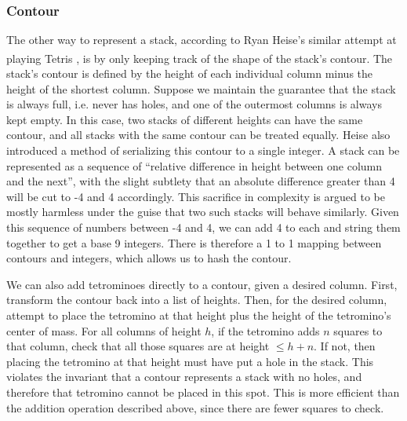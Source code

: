\documentclass[fontsize=12pt]{article}
\def\tetris{Tetris\textsuperscript{\textregistered}}
\begin{document}
\subsubsection{Contour}
\label{ssub:contour}
\par The other way to represent a stack, according to Ryan Heise's similar attempt at playing \tetris{} \cite{bib:ryan_heise}, is by only keeping track of the shape of the stack's contour. The stack's contour is defined by the height of each individual column minus the height of the shortest column. Suppose we maintain the guarantee that the stack is always full, i.e. never has holes, and one of the outermost columns is always kept empty. In this case, two stacks of different heights can have the same contour, and all stacks with the same contour can be treated equally. Heise also introduced a method of serializing this contour to a single integer. A stack can be represented as a sequence of ``relative difference in height between one column and the next'', with the slight subtlety that an absolute difference greater than 4 will be cut to -4 and 4 accordingly. This sacrifice in complexity is argued to be mostly harmless under the guise that two such stacks will behave similarly. Given this sequence of numbers between -4 and 4, we can add 4 to each and string them together to get a base 9 integers. There is therefore a 1 to 1 mapping between contours and integers, which allows us to hash the contour.
\par We can also add tetrominoes directly to a contour, given a desired column. First, transform the contour back into a list of heights. Then, for the desired column, attempt to place the tetromino at that height plus the height of the tetromino's center of mass. For all columns of height $h$, if the tetromino adds $n$ squares to that column, check that all those squares are at height $\leq h + n$. If not, then placing the tetromino at that height must have put a hole in the stack. This violates the invariant that a contour represents a stack with no holes, and therefore that tetromino cannot be placed in this spot. This is more efficient than the addition operation described above, since there are fewer squares to check.
\end{document}
